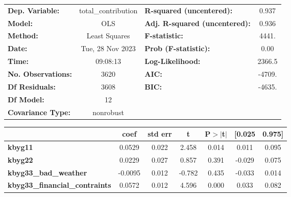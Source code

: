 \begin{center}
\begin{tabular}{lclc}
\toprule
\textbf{Dep. Variable:}                      & total\_contribution & \textbf{  R-squared (uncentered):}      &     0.937   \\
\textbf{Model:}                              &         OLS         & \textbf{  Adj. R-squared (uncentered):} &     0.936   \\
\textbf{Method:}                             &    Least Squares    & \textbf{  F-statistic:       }          &     4441.   \\
\textbf{Date:}                               &   Tue, 28 Nov 2023  & \textbf{  Prob (F-statistic):}          &     0.00    \\
\textbf{Time:}                               &       09:08:13      & \textbf{  Log-Likelihood:    }          &    2366.5   \\
\textbf{No. Observations:}                   &          3620       & \textbf{  AIC:               }          &    -4709.   \\
\textbf{Df Residuals:}                       &          3608       & \textbf{  BIC:               }          &    -4635.   \\
\textbf{Df Model:}                           &            12       & \textbf{                     }          &             \\
\textbf{Covariance Type:}                    &      nonrobust      & \textbf{                     }          &             \\
\bottomrule
\end{tabular}
\begin{tabular}{lcccccc}
                                             & \textbf{coef} & \textbf{std err} & \textbf{t} & \textbf{P$> |$t$|$} & \textbf{[0.025} & \textbf{0.975]}  \\
\midrule
\textbf{kbyg11}                              &       0.0529  &        0.022     &     2.458  &         0.014        &        0.011    &        0.095     \\
\textbf{kbyg22}                              &       0.0229  &        0.027     &     0.857  &         0.391        &       -0.029    &        0.075     \\
\textbf{kbyg33\_bad\_weather}                &      -0.0095  &        0.012     &    -0.782  &         0.435        &       -0.033    &        0.014     \\
\textbf{kbyg33\_financial\_contraints}       &       0.0572  &        0.012     &     4.596  &         0.000        &        0.033    &        0.082     \\

\end{tabular}
\end{center}
